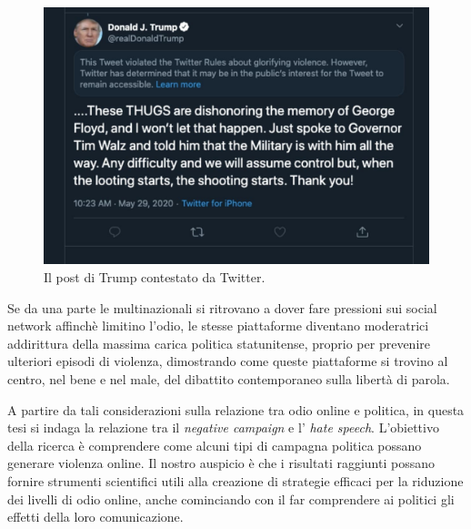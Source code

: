 \begin{figure}
	\includegraphics[width=\linewidth]{figures/trump}
	\caption{Il post di Trump contestato da Twitter.}
	\label{trump}
\end{figure}

Se da una parte le multinazionali si ritrovano a dover fare pressioni sui social network affinchè limitino l'odio, le stesse piattaforme diventano moderatrici addirittura della massima carica politica statunitense, proprio per prevenire ulteriori episodi di violenza, dimostrando come queste piattaforme si trovino al centro, nel bene e nel male, del dibattito contemporaneo sulla libertà di parola.


A partire da tali considerazioni sulla relazione tra odio online e politica, in questa tesi si indaga la relazione tra il \textit{negative campaign} e l' \textit{hate speech}. L'obiettivo della ricerca è comprendere come alcuni tipi di campagna politica possano generare violenza online. Il nostro auspicio è che i risultati raggiunti possano fornire  strumenti scientifici utili alla creazione di strategie efficaci per la riduzione dei livelli di odio online, anche cominciando con il far comprendere ai politici gli effetti della loro comunicazione.

